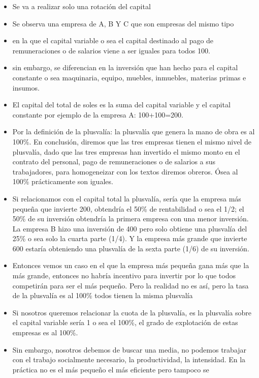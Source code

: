 \documentclass[
  letterpaper,
  DIV=11,
  numbers=noendperiod]{scrartcl}
\begin{document}
\begin{itemize}
\item
  Se va a realizar solo una rotación del capital
\item
  Se observa una empresa de A, B Y C que son empresas del mismo tipo
\item
  en la que el capital variable o sea el capital destinado al pago de
  remuneraciones o de salarios viene a ser iguales para todos 100.
\item
  sin embargo, se diferencian en la inversión que han hecho para el
  capital constante o sea maquinaria, equipo, muebles, inmuebles,
  materias primas e insumos.
\item
  El capital del total de soles es la suma del capital variable y el
  capital constante por ejemplo de la empresa A: 100+100=200.
\item
  Por la definición de la plusvalía: la plusvalía que genera la mano de
  obra es al 100\%. En conclusión, diremos que las tres empresas tienen
  el mismo nivel de plusvalía, dado que las tres empresas han invertido
  el mismo monto en el contrato del personal, pago de remuneraciones o
  de salarios a sus trabajadores, para homogeneizar con los textos
  diremos obreros. Ósea al 100\% prácticamente son iguales.
\item
  Si relacionamos con el capital total la plusvalía, sería que la
  empresa más pequeña que invierte 200, obtendría el 50\% de
  rentabilidad o sea el 1/2; el 50\% de su inversión obtendría la
  primera empresa con una menor inversión. La empresa B hizo una
  inversión de 400 pero solo obtiene una plusvalía del 25\% o sea solo
  la cuarta parte (1/4). Y la empresa más grande que invierte 600
  estaría obteniendo una plusvalía de la sexta parte (1/6) de su
  inversión.
\item
  Entonces vemos un caso en el que la empresa más pequeña gana más que
  la más grande, entonces no habría incentivo para invertir por lo que
  todos competirán para ser el más pequeño. Pero la realidad no es así,
  pero la tasa de la plusvalía es al 100\% todos tienen la misma
  plusvalía
\item
  Si nosotros queremos relacionar la cuota de la plusvalía, es la
  plusvalía sobre el capital variable sería 1 o sea el 100\%, el grado
  de explotación de estas empresas es al 100\%.
\item
  Sin embargo, nosotros debemos de buscar una media, no podemos trabajar
  con el trabajo socialmente necesario, la productividad, la intensidad.
  En la práctica no es el más pequeño el más eficiente pero tampoco se

\end{itemize}
\end{document}
